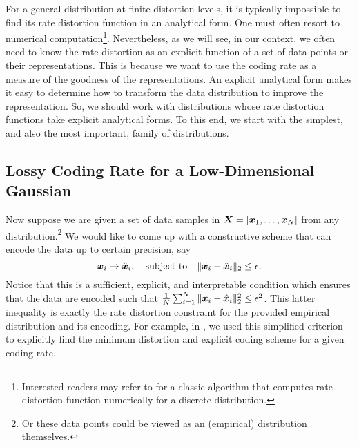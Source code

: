 \documentclass[../../book-main.tex]{subfiles}
\begin{document}
%
%

For a general distribution at finite distortion levels, it is typically impossible to find its rate
distortion function in an analytical form. One must often resort to numerical computation\footnote{Interested readers may refer to \cite{Blahut-1972} for a classic algorithm that computes rate distortion function numerically for a discrete distribution.}.  Nevertheless, as we will see, in our context, we often need to know the rate distortion as an explicit function of a set of data points or their representations. This is because we want to use the coding rate as a measure of the goodness of the representations. An explicit analytical form makes it easy to determine how to transform the data distribution to improve the representation. So, we should work with distributions whose rate distortion functions take explicit analytical forms. To this end, we start with the simplest, and also the most important, family of distributions.

\subsection{Lossy Coding Rate for a Low-Dimensional Gaussian}\label{subsec:lossy DR}
Now suppose we are given a set of data samples in $\bm{X} = [\bm{x}_1, \ldots, \bm{x}_N]$ from any distribution.\footnote{Or these data points could be viewed as an (empirical) distribution themselves.} We would like to come up with a constructive scheme that can encode the data up to certain precision, say
\begin{equation}
	\bm{x}_i \mapsto \hat {\bm{x}}_i, \quad \mbox{subject to} \quad \|\bm{x}_i - \hat {\bm{x}}_i\|_2 \le \epsilon.
\end{equation}
Notice that this is a sufficient, explicit, and interpretable condition which
ensures that the data are encoded such that \(\frac{1}{N}\sum_{i = 1}^{N}
\norm{\x_i- \hat \x_i}_2^{2} \le \epsilon^{2}\). This latter inequality is exactly the rate distortion constraint for the provided empirical distribution and its encoding. For example, in , we used this simplified criterion to explicitly find the minimum distortion and explicit coding scheme for a given coding rate.
\end{document}
